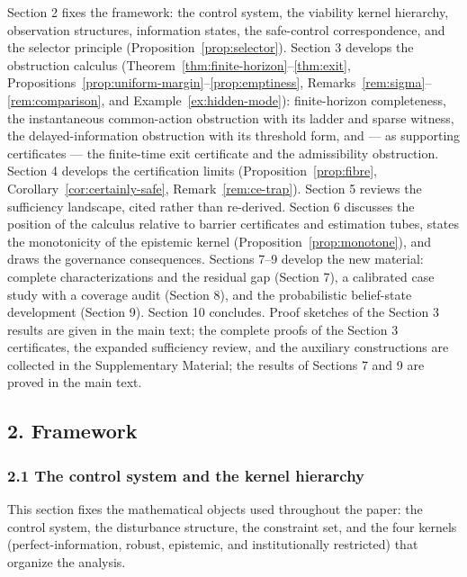\documentclass[10pt,twocolumn]{article}
\theoremstyle{definition}
\begin{document}
Section 2 fixes the framework: the control system, the viability kernel
hierarchy, observation structures, information states, the safe-control
correspondence, and the selector principle (Proposition~\ref{prop:selector}). Section 3 develops the obstruction calculus (Theorem~\ref{thm:finite-horizon}--\ref{thm:exit}, Propositions~\ref{prop:uniform-margin}--\ref{prop:emptiness}, Remarks~\ref{rem:sigma}--\ref{rem:comparison}, and Example~\ref{ex:hidden-mode}): finite-horizon completeness, the instantaneous common-action obstruction with its ladder and sparse witness, the delayed-information obstruction with its threshold form, and --- as supporting certificates --- the finite-time exit certificate and the admissibility obstruction. Section 4 develops the certification limits
(Proposition~\ref{prop:fibre}, Corollary~\ref{cor:certainly-safe}, Remark~\ref{rem:ce-trap}). Section 5 reviews the sufficiency landscape, cited rather than re-derived. Section
6 discusses the position of the calculus relative to barrier
certificates and estimation tubes, states the monotonicity of the
epistemic kernel (Proposition~\ref{prop:monotone}), and draws the governance
consequences. Sections 7--9 develop the new material: complete characterizations and the residual gap (Section 7), a calibrated case study with a coverage audit (Section 8), and the probabilistic belief-state development (Section 9). Section 10 concludes. Proof sketches of the Section 3 results are given in the main text; the complete proofs of the Section 3 certificates, the expanded sufficiency review, and the auxiliary constructions are collected in the Supplementary Material; the results of Sections 7 and 9 are proved in the main text.



\subsection{2. Framework}\label{framework}

\subsubsection{2.1 The control system and the kernel
hierarchy}\label{the-control-system-and-the-kernel-hierarchy}

This section fixes the mathematical objects used throughout the paper:
the control system, the disturbance structure, the constraint set, and
the four kernels (perfect-information, robust, epistemic, and
institutionally restricted) that organize the analysis.
\end{document}
